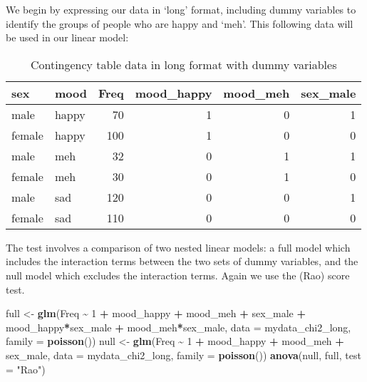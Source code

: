 \documentclass[
  12pt,
]{krantz}
\newenvironment{Shaded}{\begin{snugshade}}{\end{snugshade}}
\newcommand{\DataTypeTok}[1]{\textcolor[rgb]{0.13,0.29,0.53}{#1}}
\newcommand{\DecValTok}[1]{\textcolor[rgb]{0.00,0.00,0.81}{#1}}
\newcommand{\KeywordTok}[1]{\textcolor[rgb]{0.13,0.29,0.53}{\textbf{#1}}}
\newcommand{\NormalTok}[1]{#1}
\newcommand{\OperatorTok}[1]{\textcolor[rgb]{0.81,0.36,0.00}{\textbf{#1}}}
\newcommand{\StringTok}[1]{\textcolor[rgb]{0.31,0.60,0.02}{#1}}
\begin{document}
We begin by expressing our data in `long' format, including dummy variables to identify the groups of people who are happy and `meh'. This following data will be used in our linear model:

\begin{table}

\caption{\label{tab:unnamed-chunk-65}Contingency table data in long format with dummy variables}
\centering
\begin{tabular}[t]{llrrrr}
\toprule
sex & mood & Freq & mood\_happy & mood\_meh & sex\_male\\
\midrule
male & happy & 70 & 1 & 0 & 1\\
female & happy & 100 & 1 & 0 & 0\\
male & meh & 32 & 0 & 1 & 1\\
female & meh & 30 & 0 & 1 & 0\\
male & sad & 120 & 0 & 0 & 1\\
\addlinespace
female & sad & 110 & 0 & 0 & 0\\
\bottomrule
\end{tabular}
\end{table}

The test involves a comparison of two nested linear models: a full model which includes the interaction terms between the two sets of dummy variables, and the null model which excludes the interaction terms. Again we use the (Rao) score test.

\begin{Shaded}
\begin{Highlighting}[]
\NormalTok{full \textless{}{-}}\StringTok{ }\KeywordTok{glm}\NormalTok{(Freq }\OperatorTok{\textasciitilde{}}\StringTok{ }\DecValTok{1} \OperatorTok{+}\StringTok{ }\NormalTok{mood\_happy }\OperatorTok{+}\StringTok{ }\NormalTok{mood\_meh }\OperatorTok{+}\StringTok{ }\NormalTok{sex\_male }\OperatorTok{+}
\StringTok{                   }\NormalTok{mood\_happy}\OperatorTok{*}\NormalTok{sex\_male }\OperatorTok{+}\StringTok{ }\NormalTok{mood\_meh}\OperatorTok{*}\NormalTok{sex\_male,}
            \DataTypeTok{data =}\NormalTok{ mydata\_chi2\_long, }\DataTypeTok{family =} \KeywordTok{poisson}\NormalTok{())}
\NormalTok{null \textless{}{-}}\StringTok{ }\KeywordTok{glm}\NormalTok{(Freq }\OperatorTok{\textasciitilde{}}\StringTok{ }\DecValTok{1} \OperatorTok{+}\StringTok{ }\NormalTok{mood\_happy }\OperatorTok{+}\StringTok{ }\NormalTok{mood\_meh }\OperatorTok{+}\StringTok{ }\NormalTok{sex\_male,}
            \DataTypeTok{data =}\NormalTok{ mydata\_chi2\_long, }\DataTypeTok{family =} \KeywordTok{poisson}\NormalTok{())}
\KeywordTok{anova}\NormalTok{(null, full, }\DataTypeTok{test =} \StringTok{"Rao"}\NormalTok{)}
\end{Highlighting}
\end{Shaded}
\end{document}
